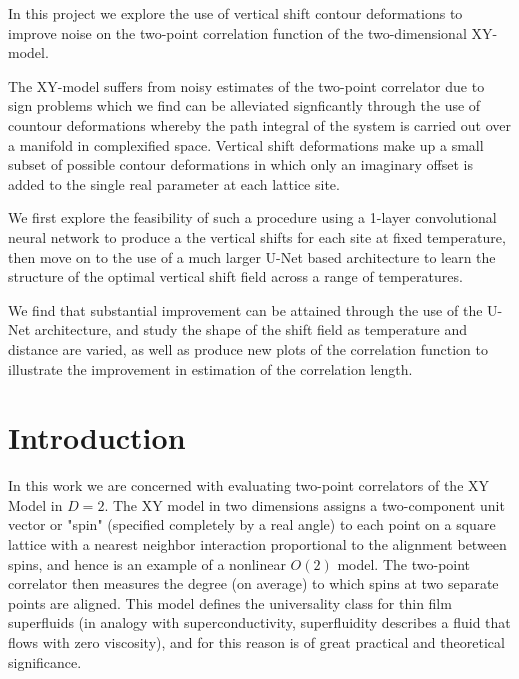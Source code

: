 \documentclass[12pt]{article}
\begin{document}
In this project we explore the use of vertical shift contour deformations to improve noise on the two-point correlation function of the
two-dimensional XY-model.

The XY-model suffers from noisy estimates of the two-point correlator due to sign problems which we find can be alleviated signficantly through
the use of countour deformations whereby the path integral of the system is carried out over a manifold in complexified space. Vertical shift deformations
make up a small subset of possible contour deformations in which only an imaginary offset is added to the single real parameter at each lattice site.

We first explore the feasibility of such a procedure using a 1-layer convolutional neural network to produce a the vertical shifts for each site at fixed temperature,
then move on to the use of a much larger U-Net based architecture to learn the structure of the optimal vertical shift field across a range of temperatures.

We find that substantial improvement can be attained through the use of the U-Net architecture, and study the shape of the shift field as temperature and
distance are varied, as well as produce new plots of the correlation function to illustrate the improvement in estimation of the correlation length.


\newpage

\tableofcontents

\newpage

\listoffigures
\listoftables

\newpage

\section{Introduction}

In this work we are concerned with evaluating two-point correlators of the XY Model in $D=2$. The XY model in two dimensions assigns a two-component unit vector or "spin"
(specified completely by a real angle) to each point on a square lattice with a nearest neighbor interaction proportional to the alignment between spins, and hence is an example of a 
nonlinear $O(2)$ model. The two-point correlator then measures the degree (on average) to which spins at two separate points are aligned.
This model defines the universality class for thin film superfluids (in analogy with superconductivity, superfluidity describes a fluid that flows with zero viscosity), 
and for this reason is of great practical and theoretical significance.
\end{document}
